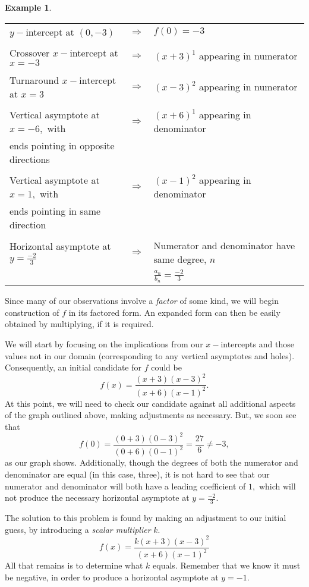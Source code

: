 \documentclass[12pt]{book}
\theoremstyle{definition}
\newtheorem{example}{Example}
\begin{document}
\begin{example}
\begin{tabular}{lcl}
$y-$intercept at $(0,-3)$ & $\Longrightarrow$ & $f(0)=-3$\\
&&\\
Crossover $x-$intercept at $x=-3$ & $\Longrightarrow$ & $(x+3)^1$ appearing in numerator\\  
&&\\
Turnaround $x-$intercept at $x=3$ & $\Longrightarrow$ & $(x-3)^2$ appearing in numerator\\
&&\\
Vertical asymptote at $x=-6,$ with & $\Longrightarrow$ & $(x+6)^1$ appearing in denominator\\
ends pointing in opposite directions &   & \\
&&\\
Vertical asymptote at $x=1,$ with & $\Longrightarrow$ & $(x-1)^2$ appearing in denominator\\
ends pointing in same direction &   & \\
&&\\
Horizontal asymptote at $y=\frac{-2}{3}$& $\Longrightarrow$ & Numerator and denominator have same degree, $n$\\
&  & $\frac{a_n}{b_n}=\frac{-2}{3}$
\end{tabular}
Since many of our observations involve a {\it factor} of some kind, we will begin construction of $f$ in its factored form.  An expanded form can then be easily obtained by multiplying, if it is required.
\par
We will start by focusing on the implications from our $x-$intercepts and those values not in our domain (corresponding to any vertical asymptotes and holes).  Consequently, an initial candidate for $f$ could be
$$f(x)=\frac{(x+3)(x-3)^2}{(x+6)(x-1)^2}.$$
At this point, we will need to check our candidate against all additional aspects of the graph outlined above, making adjustments as necessary.  But, we soon see that 
$$f(0)=\frac{(0+3)(0-3)^2}{(0+6)(0-1)^2}=\frac{27}{6}\neq -3,$$ as our graph shows.  Additionally, though the degrees of both the numerator and denominator are equal (in this case, three), it is not hard to see that our numerator and denominator will both have a leading coefficient of $1,$ which will not produce the necessary horizontal asymptote at $y=\frac{-2}{3}$.
\par
The solution to this problem is found by making an adjustment to our initial guess, by introducing a {\it scalar multiplier} $k$.
$$f(x)=\frac{k(x+3)(x-3)^2}{(x+6)(x-1)^2}$$
All that remains is to determine what $k$ equals.  Remember that we know it must be negative, in order to produce a horizontal asymptote at $y=-1$.

\end{example}
\end{document}
